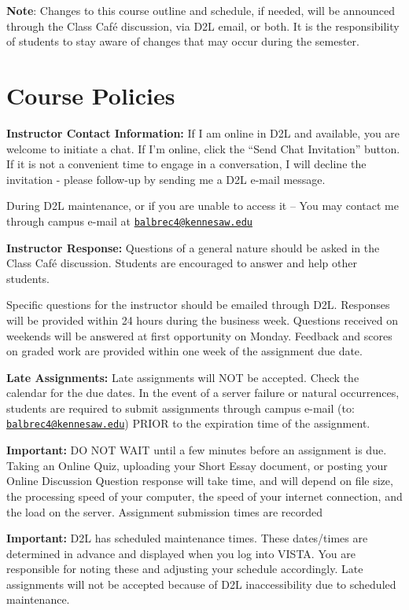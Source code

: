 \documentclass[11pt,]{article}
\begin{document}
\textbf{Note}: Changes to this course outline and schedule, if needed, will be announced through the Class Café
discussion, via D2L email, or both. It is the responsibility of students to stay aware of changes that may occur
during the semester.

\hypertarget{course-policies}{%
\section{Course Policies}\label{course-policies}}

\textbf{Instructor Contact Information:} If I am online in D2L and available, you are welcome to initiate a chat. If I'm
online, click the ``Send Chat Invitation'' button. If it is not a convenient time to engage in a conversation, I will
decline the invitation - please follow-up by sending me a D2L e-mail message.

During D2L maintenance, or if you are unable to access it -- You may contact me through campus e-mail at
\href{mailto:balbrec4@kennesaw.edu}{\nolinkurl{balbrec4@kennesaw.edu}}

\textbf{Instructor Response:} Questions of a general nature should be asked in the Class Café discussion.
Students are encouraged to answer and help other students.

Specific questions for the instructor should be emailed through D2L. Responses will be provided within 24 hours during
the business week. Questions received on weekends will be answered at first opportunity on Monday. Feedback and
scores on graded work are provided within one week of the assignment due date.

\textbf{Late Assignments:} Late assignments will NOT be accepted. Check the calendar for the due dates. In the event of a
server failure or natural occurrences, students are required to submit assignments through campus e-mail (to:
\href{mailto:balbrec4@kennesaw.edu}{\nolinkurl{balbrec4@kennesaw.edu}}) PRIOR to the expiration time of the assignment.

\textbf{Important:} DO NOT WAIT until a few minutes before an assignment is due. Taking an Online Quiz, uploading your Short
Essay document, or posting your Online Discussion Question response will take time, and will depend on file size, the
processing speed of your computer, the speed of your internet connection, and the load on the server. Assignment
submission times are recorded

\textbf{Important:} D2L has scheduled maintenance times. These dates/times are determined in advance and displayed when
you log into VISTA. You are responsible for noting these and adjusting your schedule accordingly. Late assignments will
not be accepted because of D2L inaccessibility due to scheduled maintenance.
\end{document}
